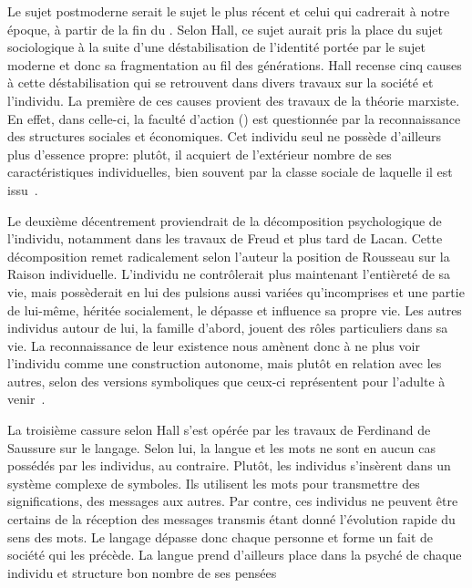 Le sujet postmoderne serait le sujet le plus récent et celui qui cadrerait à notre époque, à partir de la fin du .
Selon Hall, ce sujet aurait pris la place du sujet sociologique à la suite d'une déstabilisation de l'identité portée par le sujet moderne et donc sa fragmentation au fil des générations.
Hall recense cinq causes à cette déstabilisation qui se retrouvent dans divers travaux sur la société et l'individu.
La première de ces causes provient des travaux de la théorie marxiste.
En effet, dans celle-ci, la faculté d'action () est questionnée par la reconnaissance des structures sociales et économiques.
Cet individu seul ne possède d'ailleurs plus d'essence propre: plutôt, il acquiert de l'extérieur nombre de ses caractéristiques individuelles, bien souvent par la classe sociale de laquelle il est issu~\citeyearpar[606]{Hall1996a}.

Le deuxième décentrement proviendrait de la décomposition psychologique de l'individu, notamment dans les travaux de Freud et plus tard de Lacan.
Cette décomposition remet radicalement selon l'auteur la position de Rousseau sur la Raison individuelle.
L'individu ne contrôlerait plus maintenant l'entièreté de sa vie, mais possèderait en lui des pulsions aussi variées qu'incomprises et une partie de lui-même, héritée socialement, le dépasse et influence sa propre vie.
Les autres individus autour de lui, la famille d'abord, jouent des rôles particuliers dans sa vie.
La reconnaissance de leur existence nous amènent donc à ne plus voir l'individu comme une construction autonome, mais plutôt en relation avec les autres, selon des versions symboliques que ceux-ci représentent pour l'adulte à venir~\citeyearpar[ 607--608]{Hall1996a}.

La troisième cassure selon Hall s'est opérée par les travaux de Ferdinand de Saussure sur le langage.
Selon lui, la langue et les mots ne sont en aucun cas possédés par les individus, au contraire.
Plutôt, les individus s'insèrent dans un système complexe de symboles.
Ils utilisent les mots pour transmettre des significations, des messages aux autres.
Par contre, ces individus ne peuvent être certains de la réception des messages transmis étant donné l'évolution rapide du sens des mots.
Le langage dépasse donc chaque personne et forme un fait de société qui les précède.
La langue prend d'ailleurs place dans la psyché de chaque individu et structure bon nombre de ses pensées~\citeyearpar[608--609]{Hall1996a}

